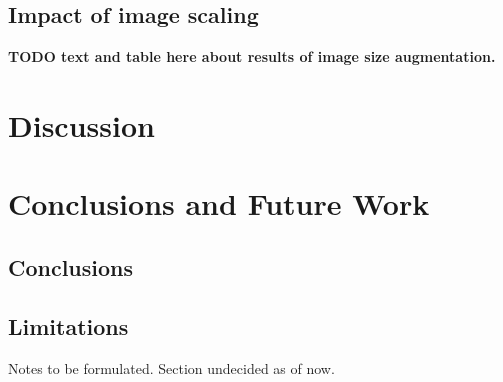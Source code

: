 \documentclass[oneside, english, bibtex]{kththesis}
\begin{document}
\begin{table}[H]
  \begin{center}
    \caption{Gradually increasing dataset size - All classes - Out set}
    \label{tab:dsizeallcoutset}
  \end{center}
\end{table}



\section{Impact of image scaling}

\textbf{TODO text and table here about results of image size augmentation.}


\chapter{Discussion}
\label{ch:disc}

\chapter{Conclusions and Future Work}
\label{ch:conc}
\section{Conclusions}
\section{Limitations}

Notes to be formulated. Section undecided as of now.
\end{document}
